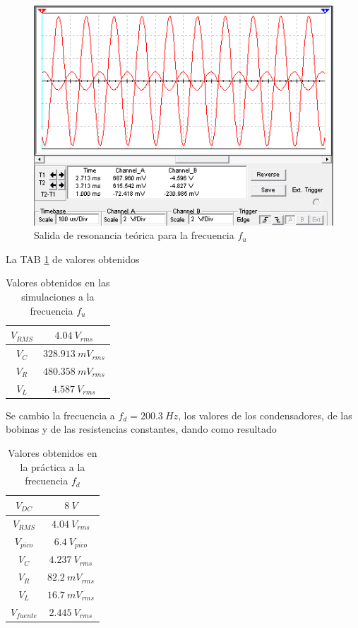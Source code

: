 \documentclass[twocolumn]{IEEEtran}
\begin{document}
\begin{figure}[H]
	\centering
		\includegraphics[scale=0.5]{sim2.png}
	\caption{Salida de resonancia teórica para la frecuencia $f_u$}
	\label{teo3}
\end{figure}
\noindent
La TAB \ref{tabteo3} de valores obtenidos 
\begin{table}[H]
	\centering
\begin{tabular}[c]{|c|c|} \hline
$V_{RMS}$ & $4.04 \ V_{rms}$ \\ \hline
$V_{C}$ & $328.913 \ mV_{rms}$ \\ \hline
$V_{R}$ & $480.358 \ mV_{rms}$ \\ \hline
$V_{L}$ & $4.587 \ V_{rms}$ \\ \hline
\end{tabular}
	\caption{Valores obtenidos en las simulaciones a la frecuencia $f_u$}
	\label{tabteo3}
\end{table}
\noindent
Se cambio la frecuencia a $f_d = 200.3\ Hz$, los valores de los condensadores, de las bobinas y de las resistencias constantes, dando como resultado
\begin{table}[H]
	\centering
\begin{tabular}[c]{|c|c|} \hline
$V_{DC}$ & $8 \ V$ \\ \hline
$V_{RMS}$ & $4.04 \ V_{rms}$ \\ \hline
$V_{pico}$ & $6.4 \ V_{pico}$ \\ \hline
$V_{C}$ & $4.237 \ V_{rms}$ \\ \hline
$V_{R}$ & $82.2 \ mV_{rms}$ \\ \hline
$V_{L}$ & $16.7 \ mV_{rms}$ \\ \hline
$V_{fuente}$ & $2.445 \ V_{rms}$ \\ \hline
\end{tabular}
	\caption{Valores obtenidos en la práctica a la frecuencia $f_d$}
	\label{tab4}
\end{table}
\end{document}
